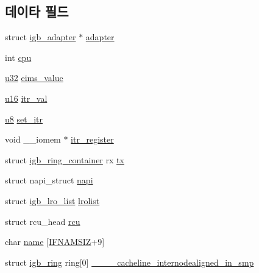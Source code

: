 \subsection*{데이타 필드}
\begin{DoxyCompactItemize}
\item 
struct \hyperlink{structigb__adapter}{igb\+\_\+adapter} $\ast$ \hyperlink{structigb__q__vector_a194d1b705839346098846e03d7ae3108}{adapter}
\item 
int \hyperlink{structigb__q__vector_a41a58b7c4446ab1abce89f43531cd523}{cpu}
\item 
\hyperlink{lib_2igb_2e1000__osdep_8h_a64e91c10a0d8fb627e92932050284264}{u32} \hyperlink{structigb__q__vector_a49e09972bdb0c5771225bae8a7d21c53}{eims\+\_\+value}
\item 
\hyperlink{lib_2igb_2e1000__osdep_8h_acdc9cf0314be0ae5a01d6d4379a95edd}{u16} \hyperlink{structigb__q__vector_a5c824c03246700ef6b4af1978dd2e604}{itr\+\_\+val}
\item 
\hyperlink{lib_2igb_2e1000__osdep_8h_a8baca7e76da9e0e11ce3a275dd19130c}{u8} \hyperlink{structigb__q__vector_a8b09ab6906db061b3b98fe51c121631c}{set\+\_\+itr}
\item 
void \+\_\+\+\_\+iomem $\ast$ \hyperlink{structigb__q__vector_a565de9cb041839ac468e909f96eda26b}{itr\+\_\+register}
\item 
struct \hyperlink{structigb__ring__container}{igb\+\_\+ring\+\_\+container} rx \hyperlink{structigb__q__vector_aaec316360e83de6c7ecc366226b7125d}{tx}
\item 
struct napi\+\_\+struct \hyperlink{structigb__q__vector_ad7946e6f4ab63e48db691b15b9a961d5}{napi}
\item 
struct \hyperlink{structigb__lro__list}{igb\+\_\+lro\+\_\+list} \hyperlink{structigb__q__vector_a4b2f61a0e7855fe81e5423f51eee5d93}{lrolist}
\item 
struct rcu\+\_\+head \hyperlink{structigb__q__vector_aa9677537ffa4e40f3c4f3e9fb3b4c76d}{rcu}
\item 
char \hyperlink{structigb__q__vector_a78c8fae70f1eba3f329993b447c05a02}{name} \mbox{[}\hyperlink{tl_2openavb__tl__pub_8h_acd06da230a96d3b7e6f193c5b3142002}{I\+F\+N\+A\+M\+S\+IZ}+9\mbox{]}
\item 
struct \hyperlink{structigb__ring}{igb\+\_\+ring} ring\mbox{[}0\mbox{]} \hyperlink{structigb__q__vector_a9fe456b522b4bed038608c9c85c55ec1}{\+\_\+\+\_\+\+\_\+\+\_\+cacheline\+\_\+internodealigned\+\_\+in\+\_\+smp}
\end{DoxyCompactItemize}


